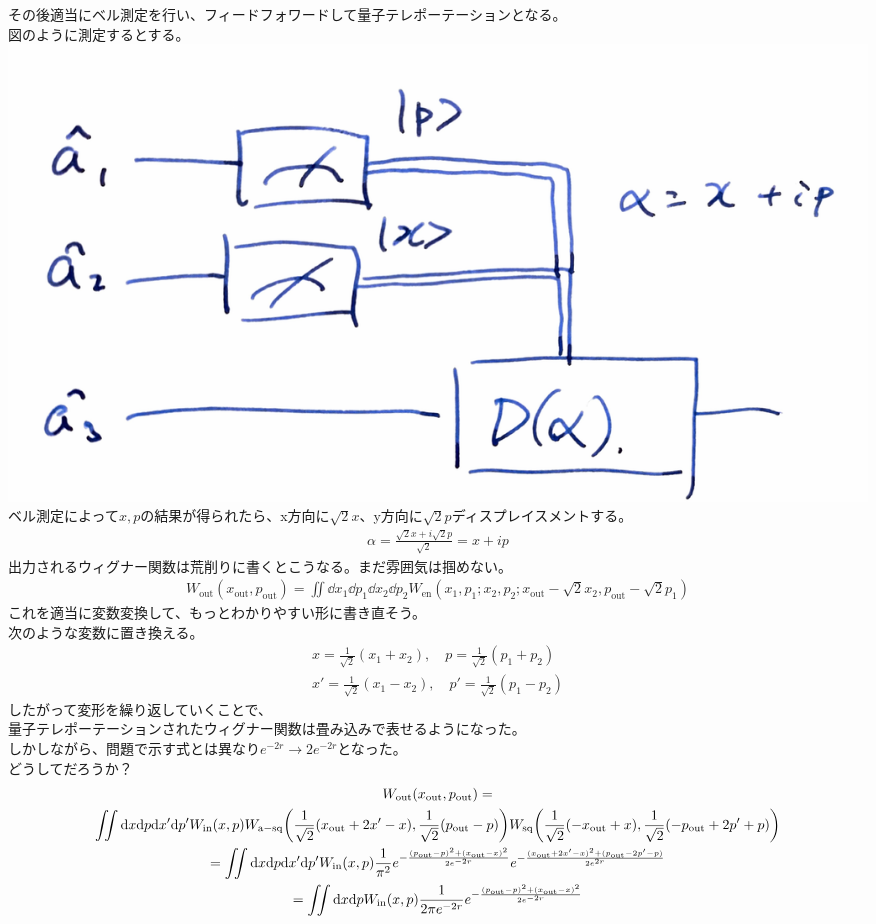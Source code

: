 \documentclass{jsarticle}
\newcommand{\mr}[1]{\mathrm{#1}}
\begin{document}
その後適当にベル測定を行い、フィードフォワードして量子テレポーテーションとなる。\\
図のように測定するとする。\\
\includegraphics[width=0.5\linewidth]{./graphics/disp.pdf}\\
ベル測定によって$x,p$の結果が得られたら、x方向に$\sqrt{2}x$、y方向に$\sqrt{2}p$ディスプレイスメントする。
\begin{gather*}
	\alpha = \frac{\sqrt{2}x + i \sqrt{2}p}{\sqrt{2}} = x + ip
\end{gather*}
出力されるウィグナー関数は荒削りに書くとこうなる。まだ雰囲気は掴めない。\\
\begin{gather*}
	W_\mr{out}(x_\mr{out}, p_\mr{out}) = \iint \dd x_1 \dd p_1 \dd x_2 \dd p_2 W_\mr{en} (x_1,p_1;x_2,p_2;x_\mr{out} - \sqrt{2}x_2,p_\mr{out} - \sqrt{2}p_1)
\end{gather*}
これを適当に変数変換して、もっとわかりやすい形に書き直そう。\\
次のような変数に置き換える。
\begin{gather*}
	x = \frac{1}{\sqrt{2}}( x_1 + x_2 ), \quad p = \frac{1}{\sqrt{2}} ( p_1 + p_2 )\\
	x' =  \frac{1}{\sqrt{2}}( x_1 - x_2 ), \quad p' = \frac{1}{\sqrt{2}} ( p_1 - p_2 )
\end{gather*}
したがって変形を繰り返していくことで、\\
量子テレポーテーションされたウィグナー関数は畳み込みで表せるようになった。\\
しかしながら、問題で示す式とは異なり$e^{-2r} \rightarrow 2e^{-2r}$となった。\\
どうしてだろうか？
\begin{gather*}
	W_\mr{out}(x_\mr{out}, p_\mr{out}) =\\
	\iint \dd x \dd p \dd x' \dd p'
	W_\mr{in} (x,p) 
	W_\mr{a-sq} \qty( \frac{1}{\sqrt{2}} ( x_\mr{out} + 2x' - x ), \frac{1}{\sqrt{2}} (p_\mr{out} - p))
	W_\mr{sq} \qty(  \frac{1}{\sqrt{2}} (-x_\mr{out} + x)   ,   \frac{1}{\sqrt{2}} ( -p_\mr{out} + 2p' + p ) )\\
	= \iint \dd x \dd p \dd x' \dd p' W_\mr{in} (x,p) \frac{1}{\pi^2} e^{- \frac{(p_\mr{out} - p)^2 + (x_\mr{out} - x)^2}{2 e^{-2r}}}
	e^{-\frac{(x_\mr{out}+2x' - x)^2 + (p_\mr{out} - 2p' -p)}{2e^{2r}}}\\
	= \iint \dd x \dd p W_\mr{in}(x,p) \frac{1}{2\pi e^{-2r}} e^{- \frac{(p_\mr{out} - p)^2 + (x_\mr{out} - x)^2}{2 e^{-2r}}}
\end{gather*}
\end{document}
